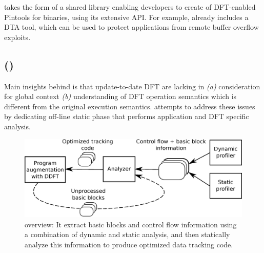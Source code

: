 \libdft takes the form of a shared library enabling developers to create of
DFT-enabled Pintools for binaries, using its extensive API. For example,
\libdft already includes a DTA tool, which can be used to protect applications
from remote buffer overflow exploits.

\subsection{\tfafull (\tfa)} 

Main insights behind \tfa is that update-to-date DFT are lacking in {\it (a)}
consideration for global context {\it (b)} understanding of DFT operation
semantics which is different from the original execution semantics.  \tfa
attempts to address these issues by dedicating off-line static phase that
performs application and DFT specific analysis. 

\begin{figure}[tb]
    \centering
    \includegraphics[width=0.65\linewidth]{figs/overview_model.eps}
    \caption{\tfa overview: It extract basic blocks and control flow
    information using a combination of dynamic and static analysis, and then
    statically analyze this information to produce optimized data tracking
    code.
   \label{fig:approach_overview}}
\end{figure}

